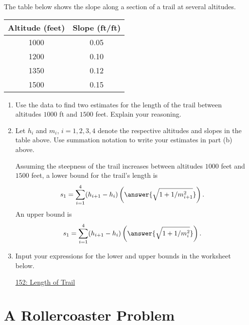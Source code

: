 \documentclass{ximera}
\begin{document}
\begin{exercise}  \label{EX:MnV443fgDF3x}
The table below shows the slope along a section of a trail at several altitudes.


\begin{tabular}{|c|c|}
\hline
Altitude (feet) & Slope (ft/ft) \\
\hline
1000 & 0.05 \\  \hline
1200 & 0.10 \\ \hline
1350 & 0.12 \\ \hline
1500 & 0.15  \\ \hline
\hline
\end{tabular}


\begin{enumerate}
\item Use the data to find two estimates for the length of the trail between altitudes $1000$ ft and $1500$ feet. Explain your reasoning.

\item Let $h_i$ and $m_i$, $i=1,2,3,4$ denote the respective altitudes and slopes in the table above. Use summation notation to write your estimates in part (b) above.

Assuming the steepness of the trail increases between altitudes $1000$ feet and $1500$ feet, a lower bound for the trail's length is
\[
    s_1 = \sum_{i=1}^4 (h_{i+1}-h_{i}) \left( \answer{\sqrt{1+1/m_{i+1}^2}} \right)  .
\]
An upper bound is
\[
    s_1 = \sum_{i=1}^4 (h_{i+1}-h_{i}) \left( \answer{\sqrt{1+1/m_{i}^2}} \right)  .
\]

\item Input your expressions for the lower and upper bounds in the worksheet below.

\begin{onlineOnly}
    \begin{center}
\end{center}
\end{onlineOnly}

\href{https://www.desmos.com/calculator/mmi4rx2rqp}{152: Length of Trail}

 

\end{enumerate}

\end{exercise}









\section{A Rollercoaster Problem}
\end{document}
